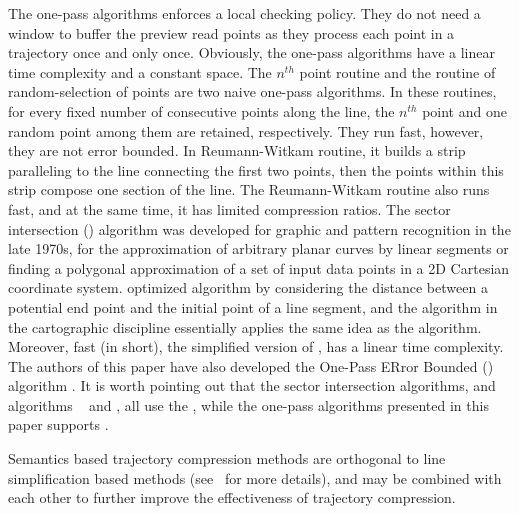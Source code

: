 The one-pass algorithms enforces a local checking policy.
They do not need a window to buffer the preview read points as they process each point in a trajectory once and only once.
Obviously, the one-pass algorithms have a linear time complexity and a constant space.
%
The $n^{th}$ point routine and the routine of random-selection of points \cite{Shi:Survey} are two naive one-pass algorithms.
In these routines, for every fixed number of consecutive points along the line, the $n^{th}$ point and one random point among them are retained, respectively.
They run fast, however, they are not error bounded.
%
In Reumann-Witkam routine\cite{Reumann:Strip}, it builds a strip paralleling to the line connecting the first two points, then the points within this strip compose one section of the line.
The Reumann-Witkam routine also runs fast, and at the same time, it has limited compression ratios.
%
The sector intersection (\cia) algorithm \cite{Williams:Longest, Sklansky:Cone} was developed for graphic and pattern recognition in the late 1970s, for the approximation of arbitrary planar curves by linear segments or finding a polygonal approximation of a set of input data points in a 2D Cartesian coordinate system. \cite{Dunham:Cone} optimized algorithm \cia by considering the distance between a potential end point and the initial point of a line segment, and the \sleeve algorithm \cite{Zhao:Sleeve} in the cartographic discipline essentially applies the same idea as the \cia algorithm.
%
Moreover, {fast \bqsa \cite{Liu:BQS} (\fbqsa in short), the simplified version of \bqsa, has a linear time complexity.}
%
The authors of this paper have also developed the One-Pass ERror Bounded (\operb) algorithm \cite{Lin:Operb}.
%
It is worth pointing out that the sector intersection algorithms\cite{Williams:Longest, Sklansky:Cone, Dunham:Cone, Zhao:Sleeve}, and algorithms \fbqsa~\cite{Liu:BQS} and \operb \cite{Lin:Operb}, all use the \ped, %
while the one-pass algorithms presented in this paper supports \sed.



Semantics based trajectory compression methods are orthogonal to line simplification based methods (see~\cite{Lin:Operb} for more details), and may be combined with each other to further improve the effectiveness of trajectory compression.

